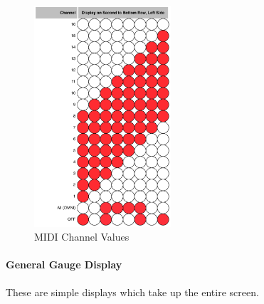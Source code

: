 \documentclass{article}
\begin{document}
\begin{figure}
\vspace{-2em}\includegraphics[width=2in]{midichannel.pdf}
\vspace{-2em}\caption{\small MIDI Channel Values}\vspace{-2em}
\label{midichannelvalues}
\end{figure}


\paragraph{General Gauge Display}  These are simple displays which take up the entire screen.
\end{document}
